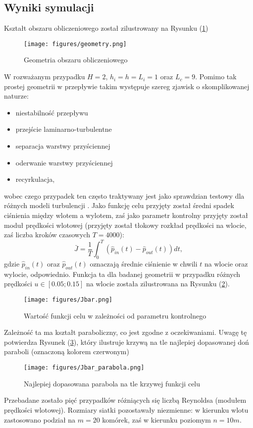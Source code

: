 \documentclass[12pt, twoside]{book}
\begin{document}
\subsection{Wyniki symulacji}
Kształt obszaru obliczeniowego został zilustrowany na Rysunku (\ref{Fig27})
\begin{figure}[H]
	\texttt{[image: figures/geometry.png]} 
	\centering
	\caption{Geometria obszaru obliczeniowego}
	\label{Fig27}
\end{figure}
W rozważanym przypadku $ H = 2 $, $ h_{i}=h=L_{i}=1 $ oraz $ L_{c}=9 $.\newline
Pomimo tak prostej geometrii w przepływie takim występuje szereg zjawisk o skomplikowanej naturze:
\begin{itemize}
	\item niestabilność przepływu
	\item przejście laminarno-turbulentne
	\item separacja warstwy przyściennej
	\item oderwanie warstwy przyściennej
	\item recyrkulacja,
\end{itemize}
wobec czego przypadek ten często traktywany jest jako sprawdzian testowy dla różnych modeli turbulencji \cite{Salazar}. \newline
Jako funkcję celu przyjęty został średni spadek ciśnienia między wlotem a wylotem, zaś jako parametr kontrolny przyjęty został moduł prędkości wlotowej (przyjęty został tłokowy rozkład prędkości na wlocie, zaś liczba kroków czasowych $ T = 4000 $):
\begin{equation}
\bar{J} = \frac{1}{T}\int_{0}^{T}(\hat{p}_{in}(t)-\hat{p}_{out}(t))dt,
\label{J_numerical}
\end{equation}
gdzie $ \hat{p}_{in}(t) $ oraz $ \hat{p}_{out}(t) $ oznaczają średnie ciśnienie w chwili $ t $ na wlocie oraz wylocie, odpowiednio. Funkcja ta dla badanej geometrii w przypadku różnych prędkości $ u \in [0.05 ; 0.15]$ na wlocie została zilustrowana na Rysunku (\ref{Fig28}).
\begin{figure}[H]
	\texttt{[image: figures/Jbar.png]} 
	\centering
	\caption{Wartość funkcji celu w zależności od parametru kontrolnego}
	\label{Fig28}
\end{figure}
Zależność ta ma kształt paraboliczny, co jest zgodne z oczekiwaniami. Uwagę tę potwierdza Rysunek (\ref{Fig29}), który ilustruje krzywą na tle najlepiej dopasowanej doń paraboli (oznaczoną kolorem czerwonym)
\begin{figure}[H]
	\texttt{[image: figures/Jbar\_parabola.png]} 
	\centering
	\caption{Najlepiej dopasowana parabola na tle krzywej funkcji celu}
	\label{Fig29}
\end{figure}
Przebadane zostało pięć przypadków różniących się liczbą Reynoldsa (modułem prędkości wlotowej). Rozmiary siatki pozostawały niezmienne: w kierunku wlotu zastosowano podział na $ m=20 $ komórek, zaś w kierunku poziomym $ n=10m $.
\end{document}
